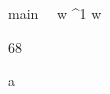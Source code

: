 \documentclass[12pt,a4paper]{book}
\begin{document}
%
\begin{eqcode}{main}{\ }{\ }{}
    w \in {}^1 \lend
    w \gets \begin{tvector}
        68        \lend
    \end{tvector} \lend
    a \gets {} \lend
     \lend 
\end{eqcode}
\end{document}
